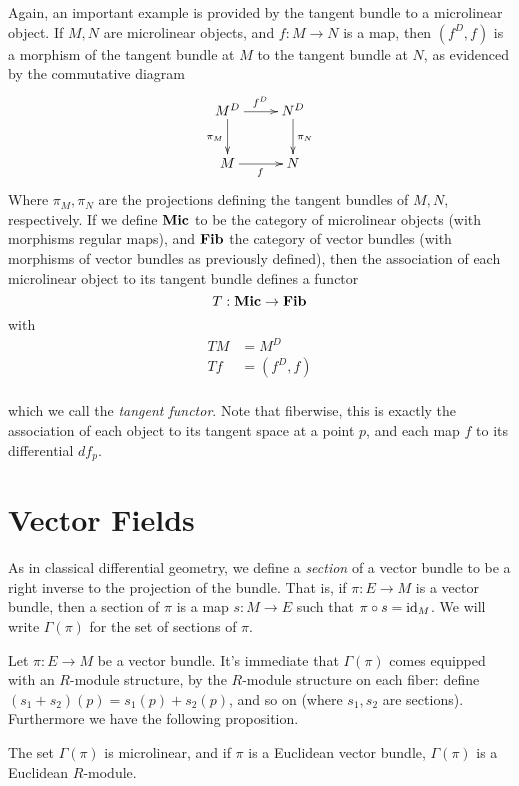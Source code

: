Again, an important example is provided by the tangent bundle to a microlinear object. If \( M,N \) are microlinear objects, and \( f:M\to N \) is a map, then \( (f^D,f) \) is a morphism of the tangent bundle at \( M \) to the tangent bundle at \( N \), as evidenced by the commutative diagram
\begin{equation*}
  \xymatrix{
    M^D \ar[d]_{\pi_M} \ar[r]^{f^D} & N^D \ar[d]^{\pi_N} \\
    M                  \ar[r]_f     & N
  }
\end{equation*}
Where \( \pi_M,\pi_N \) are the projections defining the tangent bundles of \( M,N \), respectively. If we define \( \mathbf{Mic} \) to be the category of microlinear objects (with morphisms regular maps), and \( \mathbf{Fib} \) the category of vector bundles (with morphisms of vector bundles as previously defined), then the association of each microlinear object to its tangent bundle defines a functor
\begin{equation*}
  T:\mathbf{Mic}\to\mathbf{Fib}
\end{equation*}
with
\begin{align*}
  TM &= M^D     \\
  Tf &= (f^D,f) \\
\end{align*}

which we call the \emph{tangent functor}. Note that fiberwise, this is exactly the association of each object to its tangent space at a point \( p \), and each map \( f \) to its differential \( df_p \).

\section{Vector Fields}

As in classical differential geometry, we define a \emph{section} of a vector bundle to be a right inverse to the projection of the bundle. That is, if \( \pi:E\to M \) is a vector bundle, then a section of \( \pi \) is a map \( s:M\to E \) such that \( \pi\circ s = \operatorname{id}_M \). We will write \( \Gamma(\pi) \) for the set of sections of \( \pi \).

Let \( \pi:E\to M \) be a vector bundle. It's immediate that \( \Gamma(\pi) \) comes equipped with an \( R \)-module structure, by the \( R \)-module structure on each fiber: define \( (s_1+s_2)(p) = s_1(p)+s_2(p) \), and so on (where \( s_1,s_2 \) are sections). Furthermore we have the following proposition.

\begin{proposition}
  The set \( \Gamma(\pi) \) is microlinear, and if \( \pi \) is a Euclidean vector bundle, \( \Gamma(\pi) \) is a Euclidean \( R \)-module.
\end{proposition}


